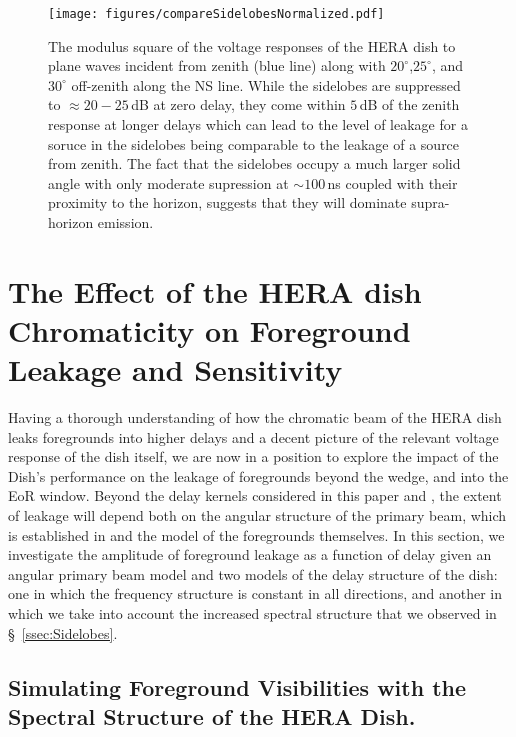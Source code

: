 \documentclass[onecolumn]{emulateapj}
\begin{document}
\begin{figure}
\texttt{[image: figures/compareSidelobesNormalized.pdf]}
\caption{The modulus square of the voltage responses of the HERA dish to plane waves incident from zenith (blue line) along with $20^\circ$,$25^\circ$, and $30^\circ$ off-zenith along the NS line. While the sidelobes are suppressed to $\approx 20-25$\,dB at zero delay, they come within $5$\,dB of the zenith response at longer delays which can lead to the level of leakage for a soruce in the sidelobes being comparable to the leakage of a source from zenith. The fact that the sidelobes occupy a much larger solid angle with only moderate supression at $\sim 100$\,ns coupled with their proximity to the horizon, suggests that they will dominate supra-horizon emission.}
\end{figure}

\section{The Effect of the HERA dish Chromaticity on Foreground Leakage and Sensitivity}
Having a thorough understanding of how the chromatic beam of the HERA dish leaks foregrounds into higher delays and a decent picture of the relevant voltage response of the dish itself, we are now in a position to explore the impact of the Dish's performance on the leakage of foregrounds beyond the wedge, and into the EoR window. Beyond the delay kernels considered in this paper and \citep{Patra:2015}, the extent of leakage will depend both on the angular structure of the primary beam, which is established in \citep{Neben:2015b} and the model of the foregrounds themselves. In this section, we investigate the amplitude of foreground leakage as a function of delay given an angular primary beam model and two models of the delay structure of the dish: one in which the frequency structure is constant in all directions, and another in which we take into account the increased spectral structure that we observed in \S~\ref{ssec:Sidelobes}. 



\subsection{Simulating Foreground Visibilities with the Spectral Structure of the HERA Dish.}
\end{document}
